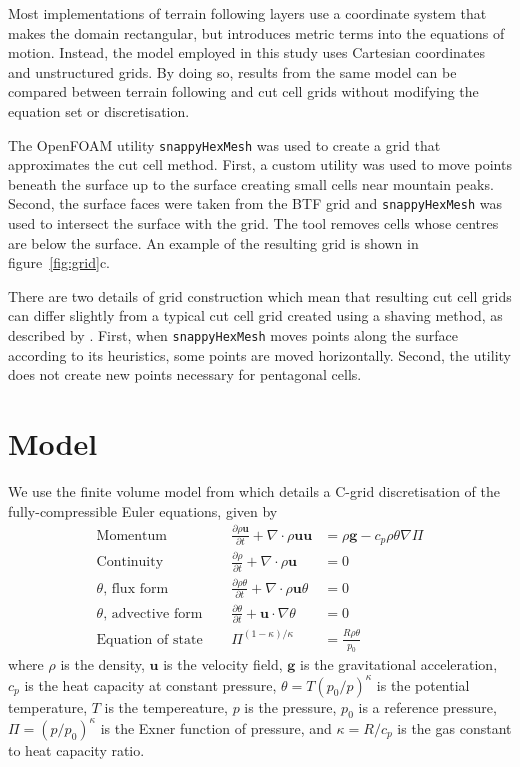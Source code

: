 \documentclass[twocol]{ametsoc}
\begin{document}
Most implementations of terrain following layers use a coordinate system that makes the domain rectangular, but introduces metric terms into the equations of motion.  Instead, the model employed in this study uses Cartesian coordinates and unstructured grids.  By doing so, results from the same model can be compared between terrain following and cut cell grids without modifying the equation set or discretisation.

The OpenFOAM utility \texttt{snappyHexMesh} was used to create a grid that approximates the cut cell method.  First, a custom utility was used to move points beneath the surface up to the surface creating small cells near mountain peaks.  Second, the surface faces were taken from the BTF grid and \texttt{snappyHexMesh} was used to intersect the surface with the grid.  The tool removes cells whose centres are below the surface.  An example of the resulting grid is shown in figure~\ref{fig:grid}c.

There are two details of grid construction which mean that resulting cut cell grids can differ slightly from a typical cut cell grid created using a shaving method, as described by \citet{adcroft1997}.  First, when \texttt{snappyHexMesh} moves points along the surface according to its heuristics, some points are moved horizontally.  Second, the utility does not create new points necessary for pentagonal cells.


\section{Model}
\label{sec:model}

We use the finite volume model from \citet{weller-shahrokhi2014} which details a C-grid discretisation of the fully-compressible Euler equations, given by
\begin{subequations}
\begin{align}
	\text{Momentum} &\ &\  	\frac{\partial \rho \bm{u}}{\partial t} + \nabla \cdot \rho \bm{uu} &= \rho \bm{g} - c_p \rho \theta \nabla \Pi \label{eq:momentum} \\
	\text{Continuity} &\ &\	\frac{\partial \rho}{\partial t} + \nabla \cdot \rho \bm{u} &= 0 \\
	\text{$\theta$, flux form} &\ &\ \frac{\partial \rho \theta}{\partial t} + \nabla \cdot \rho \bm{u} \theta &= 0 \\
	\text{$\theta$, advective form} &\ &\ \frac{\partial \theta}{\partial t} + \bm{u} \cdot \nabla \theta &= 0 \\
	\text{Equation of state} &\ &\ \Pi^{(1 - \kappa)/\kappa} &= \frac{R \rho \theta}{p_0}
\end{align}
\end{subequations}
where \(\rho\) is the density, \(\bm{u}\) is the velocity field, \(\bm{g}\) is the gravitational acceleration, \(c_p\) is the heat capacity at constant pressure, \(\theta = T \left(p_0/p\right)^\kappa\) is the potential temperature, \(T\) is the tempereature, \(p\) is the pressure, \(p_0\) is a reference pressure, \(\Pi = \left(p / p_0 \right)^\kappa\) is the Exner function of pressure, and \(\kappa = R/c_p\) is the gas constant to heat capacity ratio.
\end{document}
